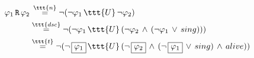 \documentclass[11pt]{article}
\begin{document}
$\begin{aligned}
     \varphi_1\,\tt{R}\,\varphi_2 &\,\overset{\ttt{n}}{=} \neg(\neg\varphi_1\,\ttt{U}\,\neg\varphi_2) \\
     &\overset{\ttt{dsc}}{=} \neg(\neg\varphi_1\,\ttt{U}\,(\neg\varphi_2\,\land\,(\neg\varphi_1\,\lor\,sing)))\\
     &\overset{\ttt{t}}{=} \neg(\neg\,\boxed{\varphi_1}\,\ttt{U}\,(\neg\,\boxed{\varphi_2}\,\land\,(\neg\,\boxed{\varphi_1}\,\lor\,sing)\,\land\,alive))
\end{aligned}$
\end{document}
